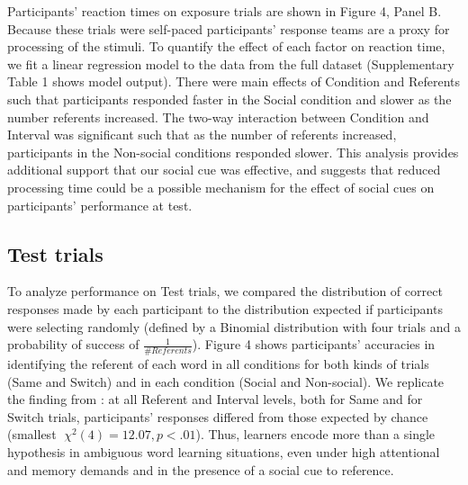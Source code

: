 \documentclass[man]{apa2}
\begin{document}
Participants' reaction times on exposure trials are shown in Figure 4, Panel B. Because these trials were self-paced participants' response teams are a proxy for processing of the stimuli. To quantify the effect of each factor on reaction time, we fit a linear regression model to the data from the full dataset (Supplementary Table 1 shows model output). There were main effects of Condition and Referents such that participants responded faster in the Social condition and slower as the number referents increased. The two-way interaction between Condition and Interval was significant such that as the number of referents increased, participants in the Non-social conditions responded slower. This analysis provides additional support that our social cue was effective, and suggests that reduced processing time could be a possible mechanism for the effect of social cues on participants' performance at test. 

\subsection{Test trials}
To analyze performance on Test trials, we compared the distribution of correct responses made by each participant to the distribution expected if participants were selecting randomly (defined by a Binomial distribution with four trials and a probability of success of  $\frac{1}{\# Referents}$). Figure 4 shows participants' accuracies in identifying the referent of each word in all conditions for both kinds of trials (Same and Switch) and in each condition (Social and Non-social). We replicate the finding from : at all Referent and Interval levels, both for Same and for Switch trials, participants' responses differed from those expected by chance (smallest $\chi^{2}(4) = 12.07, p < .01$). Thus, learners encode more than a single hypothesis in ambiguous word learning situations, even under high attentional and memory demands and in the presence of a social cue to reference. 
\end{document}
